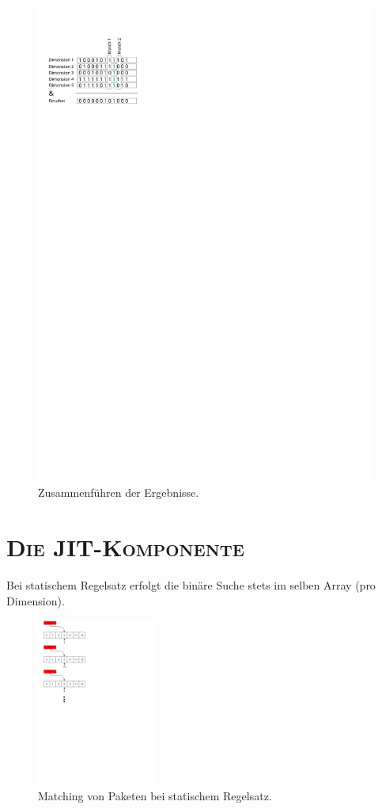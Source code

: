 \documentclass[xcolor=x11names,compress]{beamer}
\renewcommand{\(}{\begin{columns}}
\renewcommand{\)}{\end{columns}}
\newcommand{\<}[1]{\begin{column}{#1}}
\renewcommand{\>}{\end{column}}
\begin{document}
\begin{frame}
  \begin{figure}
  \centering
  \includegraphics[height=0.7\textheight]{figures/matching}
  \caption{Zusammenführen der Ergebnisse.}
  \end{figure}
\end{frame}

\section{\scshape Die JIT-Komponente}
\begin{frame}
  Bei statischem Regelsatz erfolgt die binäre Suche stets im selben Array (pro Dimension).\\
  \begin{figure}
  \centering
  \includegraphics[height=5.5cm]{figures/matching_process}
  \caption{Matching von Paketen bei statischem Regelsatz.}
  \end{figure}
\end{frame}
\end{document}
